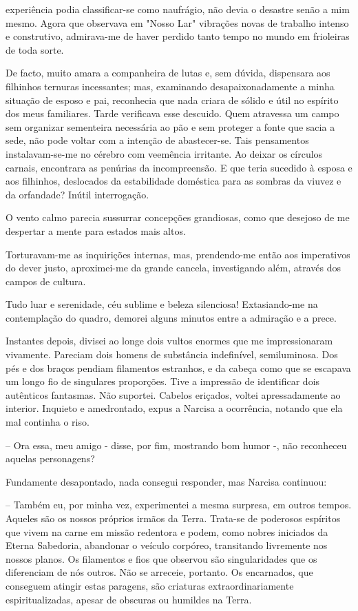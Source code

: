 \documentclass[portuguese,12pt,a4paper]{scrbook}
\begin{document}
	
	experiência podia classificar-se como naufrágio, não devia o desastre senão a mim mesmo. Agora que observava em "Nosso Lar" vibrações novas de trabalho intenso e construtivo, admirava-me de haver perdido tanto tempo no mundo em frioleiras de toda sorte.
	
	De facto, muito amara a companheira de lutas e, sem dúvida, dispensara aos filhinhos ternuras incessantes; mas, examinando desapaixonadamente a minha situação de esposo e pai, reconhecia que nada criara de sólido e útil no espírito dos meus familiares. Tarde verificava esse descuido. Quem atravessa um campo sem organizar sementeira necessária ao pão e sem proteger a fonte que sacia a sede, não pode voltar com a intenção de abastecer-se. Tais pensamentos instalavam-se-me no cérebro com veemência irritante. Ao deixar os círculos carnais, encontrara as penúrias da incompreensão. E que teria sucedido à esposa e aos filhinhos, deslocados da estabilidade doméstica para as sombras da viuvez e da orfandade? Inútil interrogação.
	
	O vento calmo parecia sussurrar concepções grandiosas, como que desejoso de me despertar a mente para estados mais altos.
	
	Torturavam-me as inquirições internas, mas, prendendo-me então aos imperativos do dever justo, aproximei-me da grande cancela, investigando além, através dos campos de cultura.
	
	Tudo luar e serenidade, céu sublime e beleza silenciosa! Extasiando-me na contemplação do quadro, demorei alguns minutos entre a admiração e a prece.
	
	Instantes depois, divisei ao longe dois vultos enormes que me impressionaram vivamente. Pareciam dois homens de substância indefinível, semiluminosa. Dos pés e dos braços pendiam filamentos estranhos, e da cabeça como que se escapava um longo fio de singulares proporções. Tive a impressão de identificar dois autênticos fantasmas. Não suportei. Cabelos eriçados, voltei apressadamente ao interior. Inquieto e amedrontado, expus a Narcisa a ocorrência, notando que ela mal continha o riso.
	
	– Ora essa, meu amigo - disse, por fim, mostrando bom humor -, não reconheceu aquelas personagens?
	
	Fundamente desapontado, nada consegui responder, mas Narcisa continuou:
	
	– Também eu, por minha vez, experimentei a mesma surpresa, em outros tempos. Aqueles são os nossos próprios irmãos da Terra. Trata-se de poderosos espíritos que vivem na carne em missão redentora e podem, como nobres iniciados da Eterna Sabedoria, abandonar o veículo corpóreo, transitando livremente nos nossos planos. Os filamentos e fios que observou são singularidades que os diferenciam de nós outros. Não se arreceie, portanto. Os encarnados, que conseguem atingir estas paragens, são criaturas extraordinariamente espiritualizadas, apesar de obscuras ou humildes na Terra.
	
\end{document}
